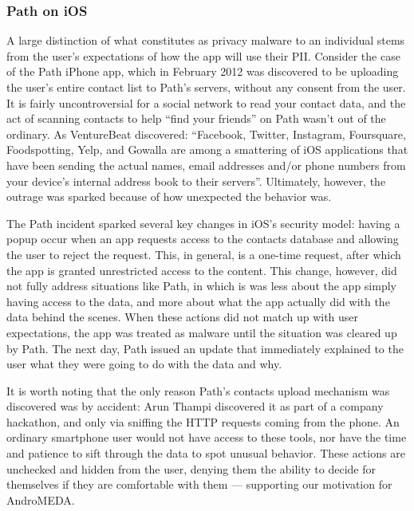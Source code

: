 \documentclass{acm_proc_article-sp}
\begin{document}
\subsubsection{Path on iOS}
\label{sec:path}
A large distinction of what constitutes as privacy malware to an individual stems from the user's expectations of how the app will use their PII. Consider the case of the Path iPhone app, which in February 2012 was discovered to be uploading the user's entire contact list to Path's servers, without any consent from the user\citep{thampi2012}. It is fairly uncontroversial for a social network to read your contact data, and the act of scanning contacts to help ``find your friends'' on Path wasn't out of the ordinary. As VentureBeat discovered: ``Facebook, Twitter, Instagram, Foursquare, Foodspotting, Yelp, and Gowalla are among a smattering of iOS applications that have been sending the actual names, email addresses and/or phone numbers from your device's internal address book to their servers''\citep{vb2012addressbook}. Ultimately, however, the outrage was sparked because of how unexpected the behavior was.

The Path incident sparked several key changes in iOS's security model: having a popup occur when an app requests access to the contacts database and allowing the user to reject the request. This, in general, is a one-time request, after which the app is granted unrestricted access to the content\citep{AppleContacts}. This change, however, did not fully address situations like Path, in which is was less about the app simply having access to the data, and more about what the app actually did with the data behind the scenes. When these actions did not match up with user expectations, the app was treated as malware until the situation was cleared up by Path. The next day, Path issued an update that immediately explained to the user what they were going to do with the data and why.

It is worth noting that the only reason Path's contacts upload mechanism was discovered was by accident: Arun Thampi discovered it as part of a company hackathon, and only via sniffing the HTTP requests coming from the phone. An ordinary smartphone user would not have access to these tools, nor have the time and patience to sift through the data to spot unusual behavior. These actions are unchecked and hidden from the user, denying them the ability to decide for themselves if they are comfortable with them --- supporting our motivation for AndroMEDA.
\end{document}
